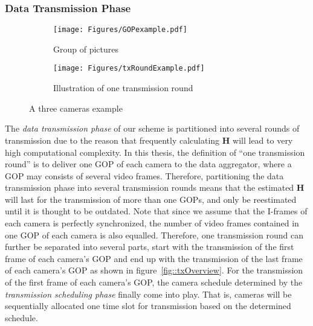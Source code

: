 {\subsubsection{Data Transmission Phase}
\label{sec::dataTransmissionPhase}
\begin{figure}
\begin{center}
\begin{subfigure}[b]{0.65\columnwidth}
\texttt{[image: Figures/GOPexample.pdf]}
\caption{\label{fig::txRoundExampleGOP}Group of pictures}
\end{subfigure}
\begin{subfigure}[b]{0.95\columnwidth}
\texttt{[image: Figures/txRoundExample.pdf]}
\caption{\label{fig::txRoundExampleTx}Illustration of one transmission round}
\end{subfigure}
\caption{\label{fig::txRoundExample}A three cameras example}
\end{center}
\end{figure}
The \emph{data transmission phase} of our scheme is partitioned into several rounds of transmission due to the reason that frequently calculating $\mathbf{H}$ will lead to very high computational complexity.
In this thesis, the definition of ``one transmission round'' is to deliver one GOP of each camera to the data aggregator, where a GOP may consists of several video frames.
Therefore, partitioning the data transmission phase into several transmission rounds means that the estimated $\mathbf{H}$ will last for the transmission of more than one GOPs, and only be reestimated until it is thought to be outdated.
Note that since we assume that the I-frames of each camera is perfectly synchronized, the number of video frames contained in one GOP of each camera is also equalled.
Therefore, one transmission round can further be separated into several parts, start with the transmission of the first frame of each camera's GOP and end up with the transmission of the last frame of each camera's GOP as shown in figure~\ref{fig::txOverview}.
For the transmission of the first frame of each camera's GOP, the camera schedule determined by the \emph{transmission scheduling phase} finally come into play.
That is, cameras will be sequentially allocated one time slot for transmission based on the determined schedule.

}
